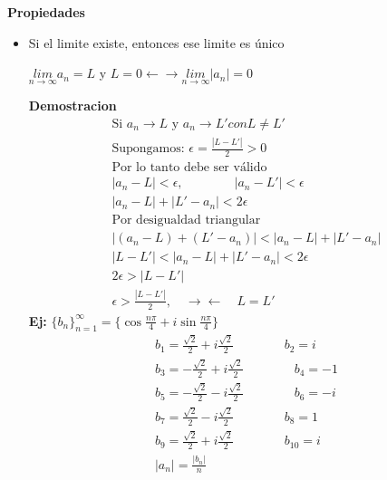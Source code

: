 \documentclass{article}
\begin{document}
\textbf{Propiedades }
\begin{itemize}
  \item Si el limite existe, entonces ese limite es único 

    $ \underset{n \rightarrow \infty}{lim } a_n = L  $ y $ L = 0 \leftarrow \rightarrow \underset{n \rightarrow \infty}{lim } |a_n| = 0 $
    
    \textbf{Demostracion }
    \begin{gather}
      \text{Si } a_n \rightarrow L \text{ y } a_n \rightarrow L'con L \neq L' \\
      \text{Supongamos: } \epsilon = \frac{|L-L'|}{2}>0\\
      \text{Por lo tanto debe ser válido }\\
      \left|a_n - L \right|<\epsilon, \qquad \qquad \left|a_n - L' \right|<\epsilon \\
      \left|a_n - L \right| + \left|L' - a_n \right|<2\epsilon \\
      \text{Por desigualdad triangular }\\
      \left|(a_n - L ) + (L' - a_n )\right|<\left|a_n -L \right| + \left|L' - a_n \right|\\
      \left|L-L' \right|< \left|a_n - L \right|+ \left|L' - a_n \right|< 2 \epsilon\\
      2 \epsilon>\left|L-L' \right|\\
      \epsilon > \frac{\left|L-L' \right|}{2}, \quad \rightarrow \leftarrow \quad L = L' 
    \end{gather}
    \textbf{Ej: } $ \{b_n \}_{n=1 } ^ {\infty} = \{\cos{\frac{n\pi}{4 }} + i \sin{\frac{n \pi}{4 }}\} $
    \begin{gather}
      b_1 = \frac{\sqrt{2} }{2 }+ i \frac{\sqrt{2 } }{2} \qquad  \qquad b_2 = i \\
      b_3 = - \frac{\sqrt{2 } }{2} + i \frac{\sqrt{2 } }{2} \qquad \qquad b_4 = -1 \\
      b_5 = - \frac{\sqrt{2 } }{2}- i \frac{\sqrt{2 } }{2 }\qquad \qquad b_6 = -i \\
      b_7 = \frac{\sqrt{2 } }{2}- i \frac{\sqrt{2} }{2} \qquad \qquad b_8 = 1 \\
      b_9 = \frac{\sqrt{2} }{2} + i \frac{\sqrt{2} }{2}\qquad \qquad b_{10} = i \\
      |a_n| = \frac{|b_n|}{n }
    \end{gather}
\end{itemize}
\end{document}

